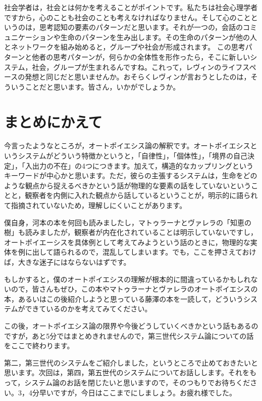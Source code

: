 \documentclass{ltjsbook}
\begin{document}
社会学者は，社会とは何かを考えることがポイントです。私たちは社会心理学者ですから，心のことも社会のことも考えなければなりません。そして心のことというのは，思考認知の要素のパターンだと思います。それが一つの，会話のコミュニケーションや生命のパターンを生み出します。その生命のパターンが他の人とネットワークを組み始めると，グループや社会が形成されます。
この思考パターンと他者の思考パターンが，何らかの全体性を形作ったら，そこに新しいシステム，社会，グループが生まれるんですね。これって，レヴィンのライフスペースの発想と同じだと思いませんか。おそらくレヴィンが言おうとしたのは，そういうことだと思います。皆さん，いかがでしょうか。

\section{まとめにかえて}

今言ったようなところが，オートポイエシス論の解釈です。オートポイエシスというシステムがどういう特徴かというと，「自律性」，「個体性」，「境界の自己決定」，「入出力の不在」の4つにつきます。加えて，構造的なカップリングというキーワードが中心かと思います。ただ，彼らの主張するシステムは，生命をどのような観点から捉えるべきかという話が物理的な要素の話をしていないということと，観察者を内側に入れた観点から話しているということが，明示的に語られて指摘されていないため，理解しにくいことがあります。

僕自身，河本の本を何回も読みましたし，マトゥラーナとヴァレラの「知恵の樹」\parencite{Chienoki}も読みましたが，観察者が内在化されていることは明示していないですし，オートポイエーシスを具体例として考えてみようという話のときに，物理的な実体を例に出して語られるので，混乱してしまいます。でも，ここを押さえておけば，大きな迷子にはならないはずです。

もしかすると，僕のオートポイエシスの理解が根本的に間違っているかもしれないので，皆さんもぜひ，この本やマトゥラーナとヴァレラのオートポイエシスの本，あるいはこの後紹介しようと思っている藤澤\parencite{fujisawaNetwork}の本を一読して，どういうシステムができているのかを考えてみてください。

この後，オートポイエシス論の限界や今後どうしていくべきかという話もあるのですが，あと5分ではまとめきれませんので，第三世代システム論についての話をここで終わります。

第二，第三世代のシステムをご紹介しました，というところで止めておきたいと思います。次回は，第四，第五世代のシステムについてお話しします。それをもって，システム論のお話を閉じたいと思いますので，そのつもりでお待ちください。3，4分早いですが，今日はここまでにしましょう。お疲れ様でした。

\printbibliography[title=引用文献]
\end{document}
